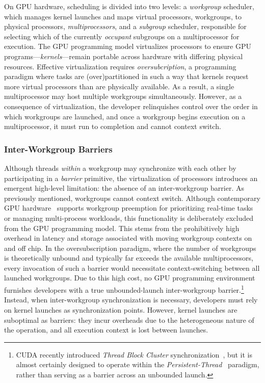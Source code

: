 \documentclass[sigconf]{acmart}
\begin{document}
On GPU hardware, scheduling is divided into two levels: a \emph{workgroup} scheduler, which manages kernel launches and maps virtual processors, workgroups, to physical processors, \emph{multiprocessors}, and a \emph{subgroup} scheduler, responsible for selecting which of the currently \emph{occupant} subgroups on a multiprocessor for execution. The GPU programming model virtualizes processors to ensure GPU programs---\emph{kernels}---remain portable across hardware with differing physical resources. Effective virtualization requires \emph{oversubcription}, a programming paradigm where tasks are (over)partitioned in such a way that kernels request more virtual processors than are physically available. As a result, a single multiprocessor may host multiple workgroups simultaneously. However, as a consequence of virtualization, the developer relinquishes control over the order in which workgroups are launched, and once a workgroup begins execution on a multiprocessor, it must run to completion and cannot context switch.

\subsubsection{Inter-Workgroup Barriers}
Although threads \emph{within} a workgroup may synchronize with each other by participating in a \emph{barrier} primitive, the virtualization of processors introduces an emergent high-level limitation: the absence of an inter-workgroup barrier. As previously mentioned, workgroups cannot context switch. Although contemporary GPU hardware~\cite{} supports workgroup preemption for prioritizing real-time tasks or managing multi-process workloads, this functionality is deliberately excluded from the GPU programming model. This stems from the prohibitively high overhead in latency and storage associated with moving workgroup contexts on and off chip. In the oversubscription paradigm, where the number of workgroups is theoretically unbound and typically far exceeds the available multiprocessors, every invocation of such a barrier would necessitate context-switching between all launched workgroups. Due to this high cost, no GPU programming environment furnishes developers with a true unbounded-launch inter-workgroup barrier.\footnote{CUDA recently introduced \emph{Thread Block Cluster} synchronization~\cite{NvidiaCudaGuide}, but it is almost certainly designed to operate within the \emph{Persistent-Thread}~\cite{gupta2012} paradigm, rather than serving as a barrier across an unbounded launch.} Instead, when inter-workgroup synchronization is necessary, developers must rely on kernel launches as synchronization points. However, kernel launches are suboptimal as barriers: they incur overheads due to the heterogeneous nature of the operation, and all execution context is lost between launches.
\end{document}
